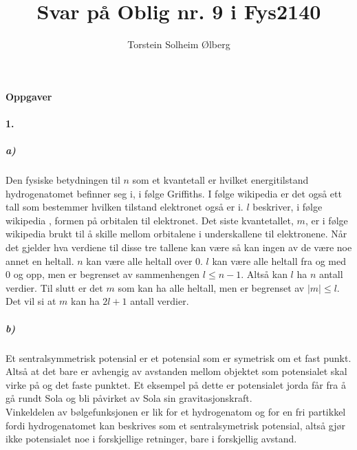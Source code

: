 \documentclass[11pt, A4paper,norsk]{article}
\author{Torstein Solheim Ølberg}
\title{Svar på Oblig nr. 9 i Fys2140}
\begin{document}
\maketitle
	\begin{center}
\Large \textbf{Oppgaver}
	\end{center}









		\paragraph{1.}
			\subparagraph{a)}
				\begin{flushleft}
Den fysiske betydningen til $n$ som et kvantetall er hvilket energitilstand hydrogenatomet befinner seg i, i følge Griffiths. I følge wikipedia \cite{wiki_n} er det også ett tall som bestemmer hvilken tilstand elektronet også er i. $l$ beskriver, i følge wikipedia \cite{wiki_l}, formen på orbitalen til elektronet. Det siste kvantetallet, $m$, er i følge wikipedia \cite{wiki_m} brukt til å skille mellom orbitalene i underskallene til elektronene.
Når det gjelder hva verdiene til disse tre tallene kan være så kan ingen av de være noe annet en heltall. $n$ kan være alle heltall over $0$. $l$ kan være alle heltall fra og med $0$ og opp, men er begrenset av sammenhengen $l \leq n - 1$. Altså kan $l$ ha $n$ antall verdier. Til slutt er det $m$ som kan ha alle heltall, men er begrenset av $|m| \leq l$. Det vil si at $m$ kan ha $2 l + 1$ antall verdier.
				\end{flushleft}









			\subparagraph{b)}
				\begin{flushleft}
Et sentralsymmetrisk potensial er et potensial som er symetrisk om et fast punkt. Altså at det bare er avhengig av avstanden mellom objektet som potensialet skal virke på og det faste punktet. Et eksempel på dette er potensialet jorda får fra å gå rundt Sola og bli påvirket av Sola sin gravitasjonskraft. \\
Vinkeldelen av bølgefunksjonen er lik for et hydrogenatom og for en fri partikkel fordi hydrogenatomet kan beskrives som et sentralsymetrisk potensial, altså gjør ikke potensialet noe i forskjellige retninger, bare i forskjellig avstand.
				\end{flushleft}
\end{document}
